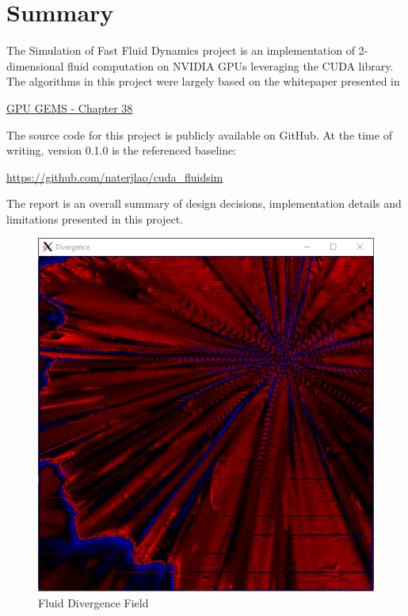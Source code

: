 \documentclass[
10pt, %
letterpaper, %
oneside, %
headinclude,footinclude, %
BCOR5mm, %
]{scrartcl}
\title{\normalfont{Fluid Simulation on CUDA GPUs}}
\subtitle{Johns Hopkins University: EN.605.617.81.SP23 Introduction to GPU Programming }
\author{\spacedlowsmallcaps{Nate Lao (nlao1@jh.edu)}}
\date{May 7th 2023}
\begin{document}
\maketitle

\section{Summary} %
The Simulation of Fast Fluid Dynamics project is an implementation of 2-dimensional fluid computation on NVIDIA GPUs leveraging the CUDA library.
The algorithms in this project were largely based on the whitepaper presented in

\begin{center}
    \href{https://developer.nvidia.com/gpugems/gpugems/part-vi-beyond-triangles/chapter-38-fast-fluid-dynamics-simulation-gpu}{GPU GEMS - Chapter 38}
\end{center}

The source code for this project is publicly available on GitHub. At the time of writing, version 0.1.0 is the referenced baseline:

\begin{center}
    \url{https://github.com/naterjlao/cuda_fluidsim}
\end{center}

The report is an overall summary of design decisions, implementation details and limitations presented in this project.
\begin{figure}[h]
    \centering
    \includegraphics[scale=0.5]{../png/divergence_example.PNG}
    \caption{Fluid Divergence Field}
\end{figure}
\end{document}
